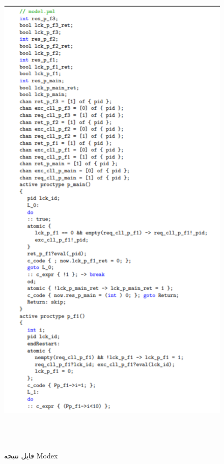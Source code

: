  \begin{figure}
	\centering
	\includegraphics[height=25cm,width=12cm]{d1.png}
	\caption{فایل نتیجه Modex}
	\centering
\end{figure}

